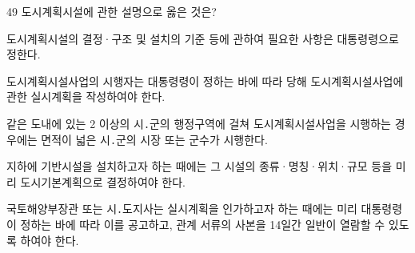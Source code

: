 \begin{question}{49}
도시계획시설에 관한 설명으로 옳은 것은?
\begin{choices}
  \item 도시계획시설의 결정·구조 및 설치의 기준 등에 관하여 필요한 사항은 대통령령으로 정한다.
  \item 도시계획시설사업의 시행자는 대통령령이 정하는 바에 따라 당해 도시계획시설사업에 관한 실시계획을 작성하여야 한다.
  \item 같은 도내에 있는 2 이상의 시․군의 행정구역에 걸쳐 도시계획시설사업을 시행하는 경우에는 면적이 넓은 시․군의 시장 또는 군수가 시행한다.
  \item 지하에 기반시설을 설치하고자 하는 때에는 그 시설의 종류·명칭·위치·규모 등을 미리 도시기본계획으로 결정하여야 한다.
  \item 국토해양부장관 또는 시․도지사는 실시계획을 인가하고자 하는 때에는 미리 대통령령이 정하는 바에 따라 이를 공고하고, 관계 서류의 사본을 14일간 일반이 열람할 수 있도록 하여야 한다.
\end{choices}
\end{question}
